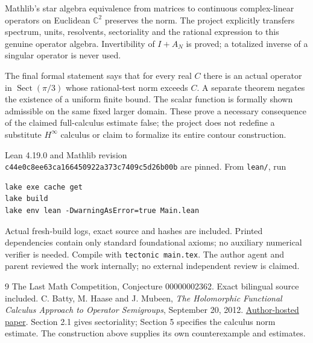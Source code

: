 \documentclass[11pt]{article}
\begin{document}
Mathlib's star algebra equivalence from matrices to
continuous complex-linear operators on Euclidean
$\mathbb C^2$ preserves the norm. The project explicitly
transfers spectrum, units, resolvents, sectoriality and
the rational expression to this genuine operator
algebra. Invertibility of $I+A_N$ is proved; a totalized
inverse of a singular operator is never used.

The final formal statement says that for every real
$C$ there is an actual operator in
$\operatorname{Sect}(\pi/3)$ whose rational-test norm
exceeds $C$. A separate theorem negates the existence
of a uniform finite bound. The scalar function is
formally shown admissible on the same fixed larger
domain. These prove a necessary consequence of the
claimed full-calculus estimate false; the project
does not redefine a substitute $H^\infty$ calculus or
claim to formalize its entire contour construction.

Lean 4.19.0 and Mathlib revision\\
\texttt{c44e0c8ee63ca166450922a373c7409c5d26b00b}
are pinned. From \texttt{lean/}, run
\begin{verbatim}
lake exe cache get
lake build
lake env lean -DwarningAsError=true Main.lean
\end{verbatim}
Actual fresh-build logs, exact source and hashes are
included. Printed dependencies contain only standard
foundational axioms; no auxiliary numerical verifier
is needed. Compile with \texttt{tectonic main.tex}.
The author agent and parent reviewed the work internally;
no external independent review is claimed.

\begin{thebibliography}{9}
 The Last Math Competition,
Conjecture 00000002362. Exact bilingual source included.
 C. Batty, M. Haase and J. Mubeen,
\emph{The Holomorphic Functional Calculus Approach to
Operator Semigroups}, September 20, 2012.
\href{https://fa.ewi.tudelft.nl/~haase/files/bahamu20-09-2012.pdf}{Author-hosted paper}.
Section 2.1 gives sectoriality; Section 5 specifies
the calculus norm estimate. The construction above
supplies its own counterexample and estimates.
\end{thebibliography}
\end{document}
